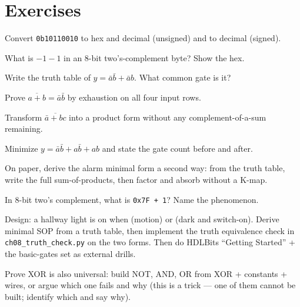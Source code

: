 \section{Exercises}
\label{sec:exercises08}

\begin{exercise}[easy]
Convert \texttt{0b10110010} to hex and decimal (unsigned) and to decimal
(signed).
\end{exercise}
\begin{exercise}[easy]
What is $-1 - 1$ in an 8-bit two's-complement byte? Show the hex.
\end{exercise}
\begin{exercise}[easy]
Write the truth table of $y=\bar a\bar b+\bar a b$. What common gate is it?
\end{exercise}
\begin{exercise}[easy]
Prove $\overline{a+b}=\bar a\bar b$ by exhaustion on all four input rows.
\end{exercise}
\begin{exercise}[medium]
Transform $\overline{\bar a + bc}$ into a product form without any
complement-of-a-sum remaining.
\end{exercise}
\begin{exercise}[medium]
Minimize $y = \bar a\bar b + a\bar b + ab$ and state the gate count
before and after.
\end{exercise}
\begin{exercise}[medium]
On paper, derive the alarm minimal form a second way: from the truth
table, write the full sum-of-products, then factor and absorb without a
K-map.
\end{exercise}
\begin{exercise}[medium]
In 8-bit two's complement, what is \texttt{0x7F + 1}? Name the
phenomenon.
\end{exercise}
\begin{exercise}[hard]
Design: a hallway light is on when (motion) or (dark and switch-on).
Derive minimal SOP from a truth table, then implement the truth
equivalence check in \texttt{ch08\_truth\_check.py} on the two forms.
Then do HDLBits ``Getting Started'' + the basic-gates set as external
drills.
\end{exercise}
\begin{exercise}[hard]
Prove XOR is also universal: build NOT, AND, OR from XOR + constants +
wires, or argue which one fails and why (this is a trick — one of them
cannot be built; identify which and say why).
\end{exercise}

